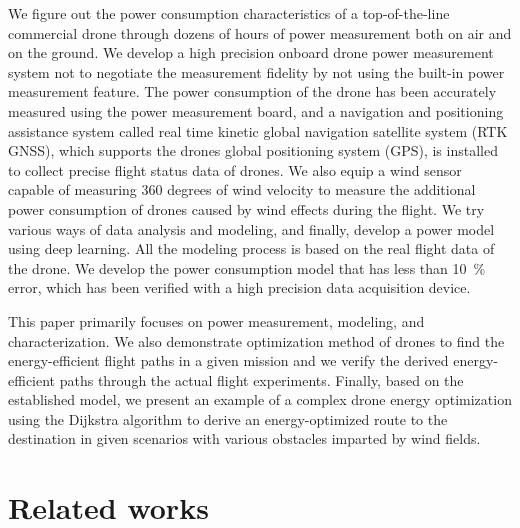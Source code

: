 \documentclass[journal]{./template/IEEEtran}
\begin{document}
We figure out the power consumption characteristics of a top-of-the-line commercial drone through dozens of hours of power measurement both on air and on the ground.
We develop a high precision onboard drone power measurement system not to negotiate the measurement fidelity by not using the built-in power measurement feature. 
The power consumption of the drone has been accurately measured using the power measurement board, and a navigation and positioning assistance system called real time kinetic global navigation satellite system (RTK GNSS), which supports the drones global positioning system (GPS), is installed to collect precise flight status data of drones.
We also equip a wind sensor capable of measuring 360 degrees of wind velocity to measure the additional power consumption of drones caused by wind effects during the flight.
We try various ways of data analysis and modeling, and finally, develop a power model using deep learning.
All the modeling process is based on the real flight data of the drone. We develop the power consumption model that has less than 10~\% error, which has been verified with a high precision data acquisition device.

This paper primarily focuses on power measurement, modeling, and characterization. 
We also demonstrate optimization method of drones to find the energy-efficient flight paths in a given mission and we verify the derived energy-efficient paths through the actual flight experiments.
Finally, based on the established model, we present an example of a complex drone energy optimization using the Dijkstra algorithm to derive an energy-optimized route to the destination in given scenarios with various obstacles imparted by wind fields.










\section{Related works}
\end{document}
